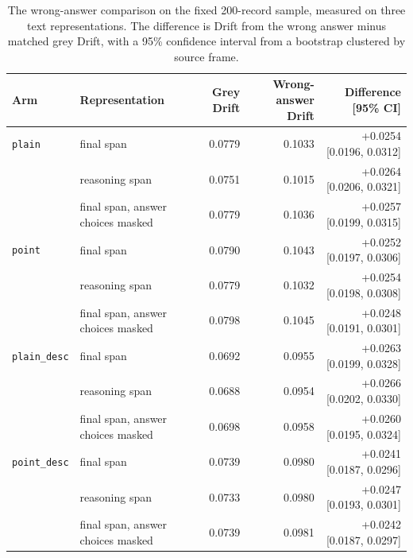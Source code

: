\begin{table}[ht]
\centering
\caption[Wrong-answer comparison by text unit]{The wrong-answer comparison on the fixed 200-record sample, measured on three text representations. The difference is Drift from the wrong answer minus matched grey Drift, with a 95\% confidence interval from a bootstrap clustered by source frame.}
\label{tab:app-rq2-echo-unit}
\begin{tabular}{llrrr}
\toprule
Arm & Representation & Grey Drift & Wrong-answer Drift & Difference [95\% CI] \\
\midrule
\texttt{plain} & final span & 0.0779 & 0.1033 & +0.0254 [0.0196, 0.0312] \\
 & reasoning span & 0.0751 & 0.1015 & +0.0264 [0.0206, 0.0321] \\
 & final span, answer choices masked & 0.0779 & 0.1036 & +0.0257 [0.0199, 0.0315] \\
\texttt{point} & final span & 0.0790 & 0.1043 & +0.0252 [0.0197, 0.0306] \\
 & reasoning span & 0.0779 & 0.1032 & +0.0254 [0.0198, 0.0308] \\
 & final span, answer choices masked & 0.0798 & 0.1045 & +0.0248 [0.0191, 0.0301] \\
\texttt{plain\_desc} & final span & 0.0692 & 0.0955 & +0.0263 [0.0199, 0.0328] \\
 & reasoning span & 0.0688 & 0.0954 & +0.0266 [0.0202, 0.0330] \\
 & final span, answer choices masked & 0.0698 & 0.0958 & +0.0260 [0.0195, 0.0324] \\
\texttt{point\_desc} & final span & 0.0739 & 0.0980 & +0.0241 [0.0187, 0.0296] \\
 & reasoning span & 0.0733 & 0.0980 & +0.0247 [0.0193, 0.0301] \\
 & final span, answer choices masked & 0.0739 & 0.0981 & +0.0242 [0.0187, 0.0297] \\
\bottomrule
\end{tabular}
\end{table}
